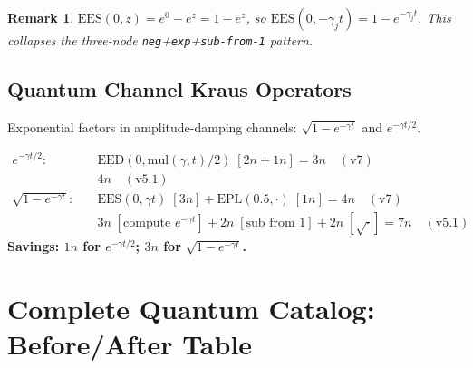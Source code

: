 \documentclass[11pt]{article}
\newtheorem{remark}[theorem]{Remark}
\begin{document}
\begin{remark}
$\mathrm{EES}(0,z)=e^0-e^z=1-e^z$, so $\mathrm{EES}(0,-\gamma_j t)=1-e^{-\gamma_j t}$.
This collapses the three-node \texttt{neg}+\texttt{exp}+\texttt{sub-from-1} pattern.
\end{remark}

\subsection{Quantum Channel Kraus Operators}

Exponential factors in amplitude-damping channels: $\sqrt{1-e^{-\gamma t}}$ and $e^{-\gamma t/2}$.

\begin{align*}
e^{-\gamma t/2}: &\quad \mathrm{EED}(0,\mathrm{mul}(\gamma,t)/2)\;[2n+1n] = 3n \quad(\text{v7})\\
                 &\quad 4n\quad(\text{v5.1})\\
\sqrt{1-e^{-\gamma t}}: &\quad \mathrm{EES}(0,\gamma t)\;[3n]+\mathrm{EPL}(0.5,\cdot)\;[1n] = 4n\quad(\text{v7})\\
                        &\quad 3n\;[\text{compute }e^{-\gamma t}]+2n\;[\text{sub from 1}]+2n\;[\sqrt{\cdot}] = 7n\quad(\text{v5.1})
\end{align*}
\textbf{Savings: $1n$ for $e^{-\gamma t/2}$; $3n$ for $\sqrt{1-e^{-\gamma t}}$.}

\section{Complete Quantum Catalog: Before/After Table}
\end{document}
